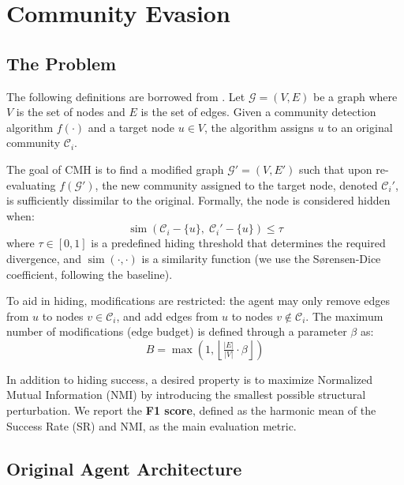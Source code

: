 \documentclass[a4paper]{article}
\begin{document}
\section{Community Evasion}

\subsection{The Problem}

The following definitions are borrowed from \parencite{bernini-2024}. Let
$\mathcal{G} = (V, E)$ be a graph where $V$ is the set of nodes and $E$ is the
set of edges. Given a community detection algorithm $f(\cdot)$ and a target
node $u \in V$, the algorithm assigns $u$ to an original community
$\mathcal{C}_i$.

The goal of CMH is to find a modified graph $\mathcal{G}' = (V, E')$ such that
upon re-evaluating $f(\mathcal{G}')$, the new community assigned to the target
node, denoted $\mathcal{C}_i'$, is sufficiently dissimilar to the original.
Formally, the node is considered hidden when:
\begin{equation}
  \operatorname{sim}(\mathcal{C}_i - \{u\},\; \mathcal{C}_i' - \{u\}) \leq \tau
  \label{eq:hiding}
\end{equation}
where $\tau \in [0,1]$ is a predefined hiding threshold that determines the
required divergence, and $\operatorname{sim}(\cdot,\cdot)$ is a similarity
function (we use the Sørensen-Dice coefficient, following the baseline).

To aid in hiding, modifications are restricted: the agent may only remove edges
from $u$ to nodes $v \in \mathcal{C}_i$, and add edges from $u$ to nodes
$v \notin \mathcal{C}_i$. The maximum number of modifications (edge budget) is
defined through a parameter $\beta$ as:
\[
  B = \max\!\left(1,\left\lfloor \tfrac{|E|}{|V|} \cdot \beta \right\rfloor\right)
\]

In addition to hiding success, a desired property is to maximize Normalized
Mutual Information (NMI) by introducing the smallest possible structural
perturbation. We report the \textbf{F1 score}, defined as the harmonic mean of
the Success Rate (SR) and NMI, as the main evaluation metric.

\subsection{Original Agent Architecture}
\end{document}
